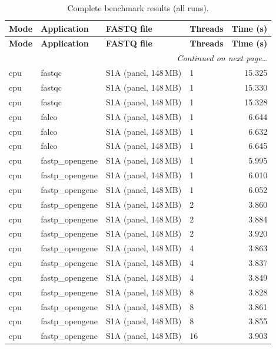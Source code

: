 \documentclass[a4paper,12pt]{article}
\begin{document}
\begin{longtable}{llllr}
  \caption{Complete benchmark results (all runs).}
  \label{tab:fullresults}\\
  \toprule
  \textbf{Mode} & \textbf{Application} & \textbf{FASTQ file} & \textbf{Threads} & \textbf{Time (s)} \\
  \midrule
  \endfirsthead
  \toprule
  \textbf{Mode} & \textbf{Application} & \textbf{FASTQ file} & \textbf{Threads} & \textbf{Time (s)} \\
  \midrule
  \endhead
  \midrule
  \multicolumn{5}{r}{\small\itshape Continued on next page\ldots}\\
  \endfoot
  \bottomrule
  \endlastfoot
  cpu & fastqc & S1A (panel, 148\,MB) & 1 & 15.325 \\
  cpu & fastqc & S1A (panel, 148\,MB) & 1 & 15.330 \\
  cpu & fastqc & S1A (panel, 148\,MB) & 1 & 15.328 \\
  cpu & falco & S1A (panel, 148\,MB) & 1 & 6.644 \\
  cpu & falco & S1A (panel, 148\,MB) & 1 & 6.632 \\
  cpu & falco & S1A (panel, 148\,MB) & 1 & 6.645 \\
  cpu & fastp\_opengene & S1A (panel, 148\,MB) & 1  & 5.995 \\
  cpu & fastp\_opengene & S1A (panel, 148\,MB) & 1  & 6.010 \\
  cpu & fastp\_opengene & S1A (panel, 148\,MB) & 1  & 6.052 \\
  cpu & fastp\_opengene & S1A (panel, 148\,MB) & 2  & 3.860 \\
  cpu & fastp\_opengene & S1A (panel, 148\,MB) & 2  & 3.884 \\
  cpu & fastp\_opengene & S1A (panel, 148\,MB) & 2  & 3.920 \\
  cpu & fastp\_opengene & S1A (panel, 148\,MB) & 4  & 3.863 \\
  cpu & fastp\_opengene & S1A (panel, 148\,MB) & 4  & 3.837 \\
  cpu & fastp\_opengene & S1A (panel, 148\,MB) & 4  & 3.849 \\
  cpu & fastp\_opengene & S1A (panel, 148\,MB) & 8  & 3.828 \\
  cpu & fastp\_opengene & S1A (panel, 148\,MB) & 8  & 3.861 \\
  cpu & fastp\_opengene & S1A (panel, 148\,MB) & 8  & 3.855 \\
  cpu & fastp\_opengene & S1A (panel, 148\,MB) & 16 & 3.903 \\

\end{longtable}
\end{document}
